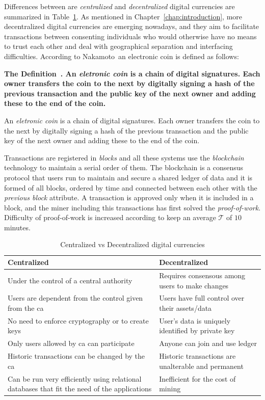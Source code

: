 \documentclass[USenglish]{uit-thesis}
\newcommand{\definition}[1]{%
  \refstepcounter{definition}%
  \par\noindent\textbf{The Definition~\thedefinition. #1}%
  \addcontentsline{def}{definition}
    {\protect\numberline{\thechapter.\thedefinition}#1}\par%
}
\begin{document}
Differences between are \emph{centralized}
and \emph{decentralized} digital currencies
are summarized in Table~\ref{tab:centralized_vs_decentralized}.
As mentioned in Chapter~\ref{chap:introduction}, more decentralized
digital currencies are emerging nowadays, and they aim
to facilitate transactions between consenting individuals who would otherwise
have no means to trust each other and deal with geographical separation and 
interfacing difficulties.
According to Nakamoto\,\cite{Nakamoto_bitcoin} an electronic coin is defined as
follows:
\definition{An \emph{eletronic coin} is a chain of digital signatures.
	Each owner transfers the coin to the next by digitally signing a hash of
	the previous transaction and the public key of the next owner and adding
	these to the end of the coin.}
Transactions are registered in \emph{blocks} and all these systems use the
\emph{blockchain} technology to maintain a serial order of them.
The blockchain is a consensus protocol that users run to maintain and secure a
shared ledger of data and it is formed of all blocks, ordered by time and connected
between each other with the \emph{previous block} attribute. A transaction is approved
only when it is included in a block, and the miner including this transactions has first
solved the \emph{proof-of-work}. Difficulty of proof-of-work is increased
according to keep an average $\mathcal{T}$ of $10$\,minutes.
\begin{table}
	\caption{Centralized vs Decentralized digital currencies}
	\label{tab:centralized_vs_decentralized}
	\centering 
	\begin{tabular}{|p{5.8cm}|p{5.8cm}|}\hline
		\textbf{Centralized}&\textbf{Decentralized}\\
		\hline
		Under the control of a central authority & Requires
		consensous among users to make changes\\
		\hline
		Users are dependent from the control given from the
		\gls{ca} & Users have full control over their assets/data\\
		\hline
		No need to enforce cryptography or to create keys & User’s data is uniquely identified by private key \\
		\hline
		Only users allowed by \gls{ca} can participate & Anyone can join and use ledger \\
		\hline
		Historic transactions can be changed by the \gls{ca} &
		Historic transactions are unalterable and permanent\\
		\hline
		Can be run very efficiently using relational
		databases that fit the need of the applications & Inefficient
		for the cost of mining \\
		\hline		
	\end{tabular}
\end{table}
\end{document}
